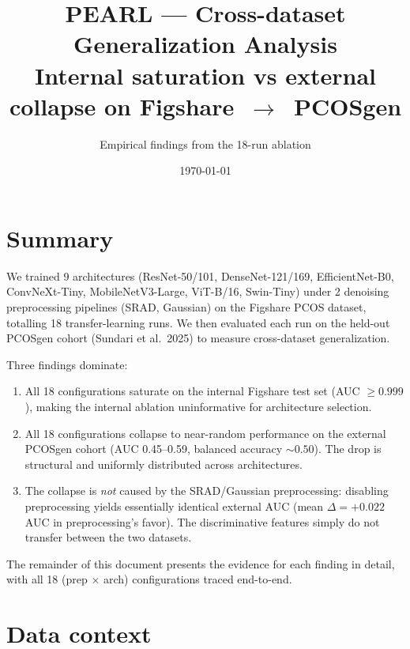 \documentclass[11pt]{article}
\title{PEARL — Cross-dataset Generalization Analysis\\[0.2em]
\large Internal saturation vs external collapse on Figshare~$\rightarrow$~PCOSgen}
\author{Empirical findings from the 18-run ablation}
\date{\today}
\begin{document}
\maketitle

\section{Summary}

We trained 9 architectures (ResNet-50/101, DenseNet-121/169, EfficientNet-B0,
ConvNeXt-Tiny, MobileNetV3-Large, ViT-B/16, Swin-Tiny) under 2 denoising
preprocessing pipelines (SRAD, Gaussian) on the Figshare PCOS dataset, totalling
18 transfer-learning runs. We then evaluated each run on the held-out PCOSgen
cohort (Sundari et al.\ 2025) to measure cross-dataset generalization.

Three findings dominate:

\begin{enumerate}
  \item All 18 configurations saturate on the internal Figshare test set
        (AUC $\geq 0.999$), making the internal ablation uninformative for
        architecture selection.
  \item All 18 configurations collapse to near-random performance on the
        external PCOSgen cohort (AUC 0.45--0.59, balanced accuracy $\sim 0.50$).
        The drop is structural and uniformly distributed across architectures.
  \item The collapse is \emph{not} caused by the SRAD/Gaussian preprocessing:
        disabling preprocessing yields essentially identical external AUC
        (mean $\Delta = +0.022$ AUC in preprocessing's favor). The
        discriminative features simply do not transfer between the two datasets.
\end{enumerate}

The remainder of this document presents the evidence for each finding in
detail, with all 18 (prep $\times$ arch) configurations traced end-to-end.

\section{Data context}
\end{document}
